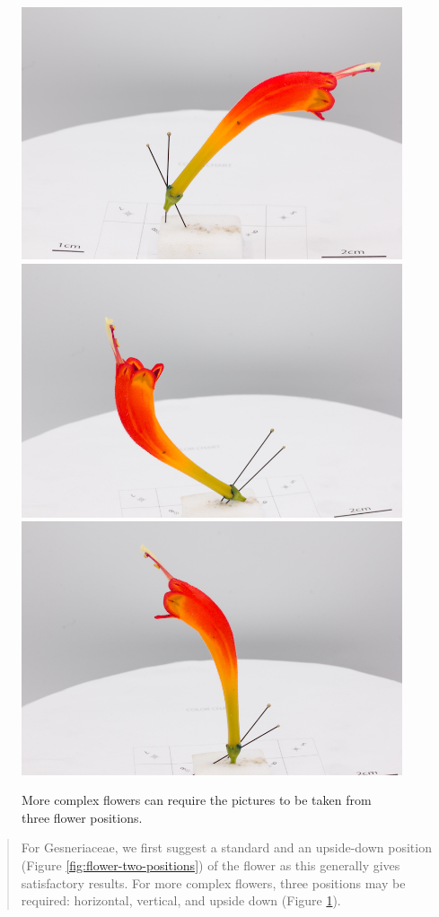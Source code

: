 \documentclass[
]{book}
\begin{document}
\begin{figure}

{\centering \includegraphics[width=0.33\linewidth]{Figures/flowerplacement_1} \includegraphics[width=0.33\linewidth]{Figures/flowerplacement_2} \includegraphics[width=0.33\linewidth]{Figures/flowerplacement_3} 

}

\caption{More complex flowers can require the pictures to be taken from three flower positions.}\label{fig:flower-three-positions}
\end{figure}

\begin{quote}
For Gesneriaceae, we first suggest a standard and an
upside-down position (Figure \ref{fig:flower-two-positions}) of the flower as this generally gives satisfactory results. For more complex flowers, three positions may be required: horizontal, vertical, and upside down (Figure
\ref{fig:flower-three-positions}).
\end{quote}
\end{document}
